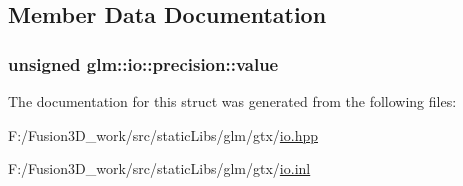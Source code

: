 \subsection{Member Data Documentation}
\hypertarget{structglm_1_1io_1_1precision_a43da772dff9a209768c63f1220d52074}{}
\subsubsection[{value}]{\setlength{\rightskip}{0pt plus 5cm}unsigned glm\+::io\+::precision\+::value}\label{structglm_1_1io_1_1precision_a43da772dff9a209768c63f1220d52074}


The documentation for this struct was generated from the following files\+:\begin{DoxyCompactItemize}
\item 
F\+:/\+Fusion3\+D\+\_\+work/src/static\+Libs/glm/gtx/\hyperlink{io_8hpp}{io.\+hpp}\item 
F\+:/\+Fusion3\+D\+\_\+work/src/static\+Libs/glm/gtx/\hyperlink{io_8inl}{io.\+inl}\end{DoxyCompactItemize}
